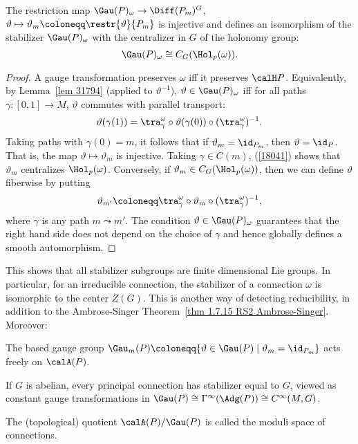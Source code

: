 \begin{prop}
    The restriction map $\Gau(P)_\omega\to \Diff(P_m)^G$, $\vartheta\mapsto \vartheta_m\coloneqq\restr{\vartheta}{P_m}$ is injective and defines an isomorphism of the stabilizer $\Gau(P)_\omega$ with the centralizer in $G$ of the holonomy group:
    \[\Gau(P)_\omega\cong C_G(\Hol_p(\omega)).\]
\end{prop}
\begin{proof}
    A gauge transformation preserves $\omega$ iff it preserves $\calH P$. Equivalently, by Lemma~\ref{lem 31794} (applied to $\vartheta^{-1}$), $\vartheta\in\Gau(P)_\omega$ iff for all paths $\gamma:[0,1]\to M$, $\vartheta$ commutes with parallel transport:
    \[\vartheta(\gamma(1))=\tra_\gamma^\omega\circ \vartheta(\gamma(0))\circ(\tra_\gamma^\omega)^{-1}.\label{18041}\]
    Taking paths with $\gamma(0)=m$, it follows that if $\vartheta_m=\id_{P_m}$, then $\vartheta=\id_P$. That is, the map $\vartheta\mapsto\vartheta_m$ is injective. Taking $\gamma\in C(m)$, (\ref{18041}) shows that $\vartheta_m$ centralizes $\Hol_p(\omega)$. Conversely, if $\vartheta_m\in C_G(\Hol_p(\omega))$, then we can define $\vartheta$ fiberwise by putting
    \[\vartheta_{m'}\coloneqq \tra_\gamma^\omega\circ \vartheta_m\circ (\tra_\gamma^\omega)^{-1},\]
    where $\gamma$ is any path $m\leadsto m'$. The condition $\vartheta\in \Gau(P)_\omega$ guarantees that the right hand side does not depend on the choice of $\gamma$ and hence globally defines a smooth automorphism.
\end{proof}

This shows that all stabilizer subgroups are finite dimensional Lie groups. In particular, for an irreducible connection, the stabilizer of a connection $\omega$ is isomorphic to the center $Z(G)$. This is another way of detecting reducibility, in addition to the Ambrose-Singer Theorem~\ref{thm 1.7.15 RS2 Ambrose-Singer}. Moreover:

\begin{cor}
    The based gauge group $\Gau_m(P)\coloneqq \{\vartheta\in \Gau(P)\mid \vartheta_m=\id_{P_m}\}$ acts freely on $\calA(P)$.
\end{cor}
\begin{cor}
    If $G$ is abelian, every principal connection has stabilizer equal to $G$, viewed as constant gauge transformations in $\Gau(P)\cong \Gamma^\infty(\Adg(P))\cong C^\infty(M,G)$.
\end{cor}

\begin{defn}
    The (topological) quotient $\calA(P)\slash \Gau(P)$ is called the moduli space of connections. 
\end{defn}

